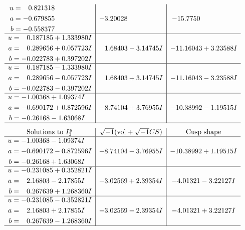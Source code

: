 \documentclass[1p]{elsarticle_modified}
\theoremstyle{definition}
\newcommand{\I}{\sqrt{-1}}
\begin{document}
$$\begin{array}{c|c|c}
\begin{aligned}
u &= \phantom{-}0.821318\phantom{ +0.000000I} \\
a &= -0.679855\phantom{ +0.000000I} \\
b &= -0.558377\phantom{ +0.000000I}\end{aligned}
 & -3.20028\phantom{ +0.000000I} & -15.7750\phantom{ +0.000000I} \\ \hline\begin{aligned}
u &= \phantom{-}0.187185 + 1.333980 I \\
a &= \phantom{-}0.289656 + 0.057723 I \\
b &= -0.022783 + 0.397202 I\end{aligned}
 & \phantom{-}1.68403 - 3.14745 I & -11.16043 + 3.23588 I \\ \hline\begin{aligned}
u &= \phantom{-}0.187185 - 1.333980 I \\
a &= \phantom{-}0.289656 - 0.057723 I \\
b &= -0.022783 - 0.397202 I\end{aligned}
 & \phantom{-}1.68403 + 3.14745 I & -11.16043 - 3.23588 I \\ \hline\begin{aligned}
u &= -1.00368 + 1.09374 I \\
a &= -0.690172 + 0.872596 I \\
b &= -0.26168 - 1.63068 I\end{aligned}
 & -8.74104 + 3.76955 I & -10.38992 - 1.19515 I\\
 \hline 
 \end{array}$$\newpage$$\begin{array}{c|c|c}  
\text{Solutions to }I^u_{3}& \I (\text{vol} + \sqrt{-1}CS) & \text{Cusp shape}\\
 \hline 
\begin{aligned}
u &= -1.00368 - 1.09374 I \\
a &= -0.690172 - 0.872596 I \\
b &= -0.26168 + 1.63068 I\end{aligned}
 & -8.74104 - 3.76955 I & -10.38992 + 1.19515 I \\ \hline\begin{aligned}
u &= -0.231085 + 0.352821 I \\
a &= \phantom{-}2.16803 - 2.17855 I \\
b &= \phantom{-}0.267639 + 1.268360 I\end{aligned}
 & -3.02569 + 2.39354 I & -4.01321 - 3.22127 I \\ \hline\begin{aligned}
u &= -0.231085 - 0.352821 I \\
a &= \phantom{-}2.16803 + 2.17855 I \\
b &= \phantom{-}0.267639 - 1.268360 I\end{aligned}
 & -3.02569 - 2.39354 I & -4.01321 + 3.22127 I\\
 \hline 
 \end{array}$$\newpage
\end{document}
